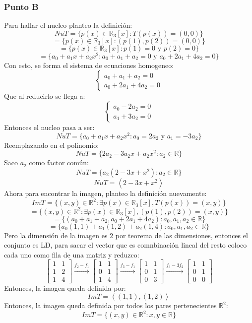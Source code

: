 \documentclass[a4paper,12pt]{article}
\begin{document}
\subsubsection{Punto B}
Para hallar el nucleo planteo la definición:
$$
NuT = \{ p(x) \in \mathds{R}_3[x] : T(p(x))=(0,0) \}
$$
$$
= \{ p(x) \in \mathds{R}_3[x] : (p(1),p(2))=(0,0) \}
$$
$$
= \{ p(x) \in \mathds{R}_3[x] : p(1)=0 \text{ y } p(2)=0 \}
$$
$$
= \{ a_0+a_1x+a_2x^2: a_0+a_1+a_2=0 \text{ y } a_0+2a_1+4a_2=0 \}
$$
Con esto, se forma el sistema de ecuaciones homogeneo:
$$
\begin{cases}
    a_0+a_1+a_2=0 \\
    a_0+2a_1+4a_2=0
\end{cases}
$$
Que al reducirlo se llega a:
$$
\begin{cases}
    a_0-2a_2 = 0 \\
    a_1+3a_2 = 0
\end{cases}
$$
Entonces el nucleo pasa a ser:
$$
NuT = \{ a_0+a_1x+a_2x^2: a_0=2a_2 \text{ y } a_1=-3a_2 \}
$$
Reemplazando en el polinomio:
$$
NuT = \{ 2a_2-3a_2x+a_2x^2: a_2\in\mathds{R} \}
$$
Saco $a_2$ como factor común:
$$
NuT = \{ a_2(2-3x+x^2): a_2\in\mathds{R} \}
$$
$$
NuT = \left \langle 2-3x+x^2 \right \rangle
$$
Ahora para encontrar la imagen, planteo la definición nuevamente:
$$
ImT = \{ (x,y) \in \mathds{R}^2 : \exists p(x) \in \mathds{R}_3[x], T(p(x))=(x,y) \}
$$
$$
= \{ (x,y) \in \mathds{R}^2 : \exists p(x) \in \mathds{R}_3[x], (p(1),p(2))=(x,y) \}
$$
$$
= \{ (a_0+a_1+a_2,a_0+2a_1+4a_2) : a_0,a_1,a_2\in\mathds{R} \}
$$
$$
= \{ a_0(1,1) + a_1(1,2) + a_2(1,4) : a_0,a_1,a_2\in\mathds{R} \}
$$
Pero la dimensión de la imagen es 2 por teorema de las dimensiones, entonces el conjunto es LD, para sacar el vector que es comnbinación lineal del resto coloco cada uno como fila de una matriz y reduzco:
$$
\begin{bmatrix}
    1 & 1  \\
    1 & 2  \\
    1 & 4
\end{bmatrix}
\xrightarrow[]{f_2-f_1}
\begin{bmatrix}
    1 & 1  \\
    0 & 1  \\
    1 & 4
\end{bmatrix}
\xrightarrow[]{f_3-f_1}
\begin{bmatrix}
    1 & 1  \\
    0 & 1  \\
    0 & 3
\end{bmatrix}
\xrightarrow[]{f_3-3f_2}
\begin{bmatrix}
    1 & 1  \\
    0 & 1  \\
    0 & 0
\end{bmatrix}
$$
Entonces, la imagen queda definida por:
$$
ImT = \left \langle (1,1), (1,2) \right \rangle
$$
Entonces, la imagen queda definida por todos los pares pertenecientes $\mathds{R}^2$:
$$
ImT = \{ (x,y) \in \mathds{R}^2 : x,y\in\mathds{R} \}
$$
\newpage
\end{document}

